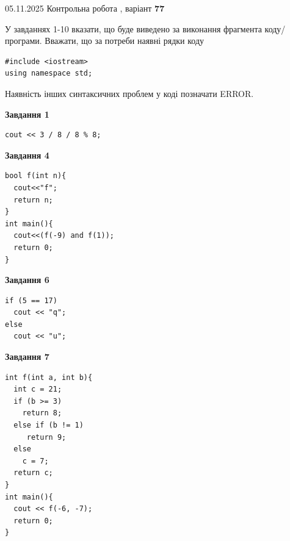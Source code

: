 \documentclass[12pt, ukrainian]{article}
\begin{document}
{\Large{05.11.2025 Контрольна робота , варіант  \No \textbf { 77 }\par}}
{
\begin {large}
У завданнях 1-10 вказати, що буде виведено за виконання фрагмента коду/про\-гра\-ми.
Вважати, що за потреби наявні рядки коду
\begin{verbatim}
#include <iostream>
using namespace std;
\end{verbatim}
Наявність інших синтаксичних проблем у коді позначати ERROR.

\begin{minipage}[t]{7.0cm}

\begin{center}
\textbf{Завдання 1}
\end{center}
\vspace{-8mm}

\begin{verbatim}
cout << 3 / 8 / 8 % 8;
\end{verbatim}



\begin{center}
\textbf{Завдання 4}
\end{center}
\vspace{-8mm}

\begin{verbatim}
bool f(int n){
  cout<<"f";
  return n;
}
int main(){
  cout<<(f(-9) and f(1));
  return 0;
}
\end{verbatim}



\begin{center}
\textbf{Завдання 6}
\end{center}
\vspace{-8mm}

\begin{verbatim}
if (5 == 17)
  cout << "q";
else
  cout << "u";
\end{verbatim}



\begin{center}
\textbf{Завдання 7}
\end{center}
\vspace{-8mm}

\begin{verbatim}
int f(int a, int b){
  int c = 21;
  if (b >= 3)
    return 8;
  else if (b != 1)
     return 9;
  else
    c = 7;
  return c;
}
int main(){
  cout << f(-6, -7);
  return 0;
}
\end{verbatim}


\end{minipage}
\end{large}}
\end{document}
